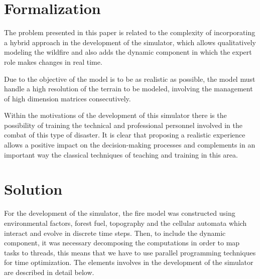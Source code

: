 \documentclass[conference]{IEEEtran}
\begin{document}
  \section{Formalization}
    
    
    The problem presented in this paper is related to the complexity of incorporating a hybrid 
    approach in the development of the simulator, which allows qualitatively modeling the wildfire
    and also adds the dynamic component in which the expert role makes changes in real time.
    
    Due to the objective of the model is to be as realistic as possible, the model must handle a 
    high resolution of the terrain to be modeled, involving the management of high dimension matrices 
    consecutively.
    
    Within the motivations of the development of this simulator there is the possibility of 
    training the technical and professional personnel involved in the combat of this type of 
    disaster. It is clear that proposing a realistic experience allows a positive impact on the 
    decision-making processes and complements in an important way the classical techniques of 
    teaching and training in this area.
    

  \section{Solution}

    For the development of the simulator, the fire model was constructed using 
    environmental factors, forest fuel, topography and the cellular automata which interact and evolve in 
    discrete time steps. Then, to include the dynamic component, it was necessary decomposing 
    the computations in order to map tasks to threads, this means that we have to use parallel 
    programming techniques for time optimization. The elements involves in the
    development of the simulator are described in detail below.
\end{document}
